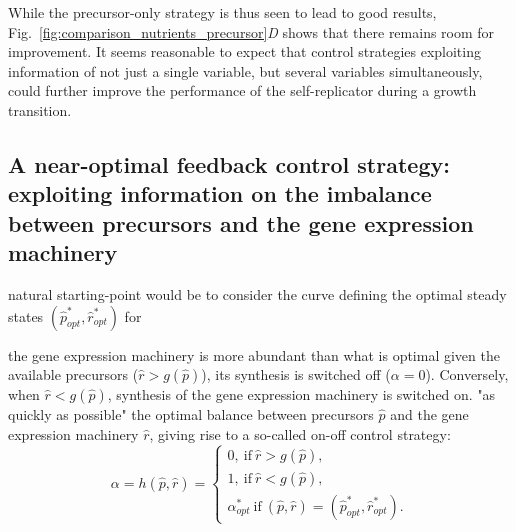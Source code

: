 While the precursor-only strategy is thus seen to lead to good results, Fig.~\ref{fig:comparison_nutrients_precursor}\textit{D} shows that there remains room for improvement.
It seems reasonable to expect that control strategies exploiting information of not just a single variable, but several variables simultaneously, could further improve the performance of the self-replicator during a growth transition.


\subsection*{A near-optimal feedback control strategy: exploiting information on the imbalance between precursors and the gene expression machinery}
\label{sec:strategies}

 natural starting-point would be to consider the curve defining the optimal steady states $(\hat{p}^*_{opt},\hat{r}^*_{opt})$  for 

 the gene expression machinery is more abundant than what is optimal given the available precursors ($\hat{r} > g(\hat{p})$), its synthesis is switched off ($\alpha = 0$).
Conversely, when $\hat{r} < g(\hat{p})$, synthesis of the gene expression machinery is switched on.
 "as quickly as possible" the optimal balance between precursors $\hat{p}$ and the gene expression machinery $\hat{r}$, giving rise to a so-called on-off control strategy:
\begin{equation}
\label{eq:stratswitch}
\alpha = h(\hat{p},\hat{r}) =
\begin{cases}
0, \ \textrm{if} \ \hat{r} > g(\hat{p}),\\
1, \ \textrm{if} \ \hat{r} < g(\hat{p}), \\
\alpha_{opt}^* \ \textrm{if} \ (\hat{p},\hat{r})=(\hat{p}_{opt}^*,\hat{r}_{opt}^*).
\end{cases}
\end{equation}

